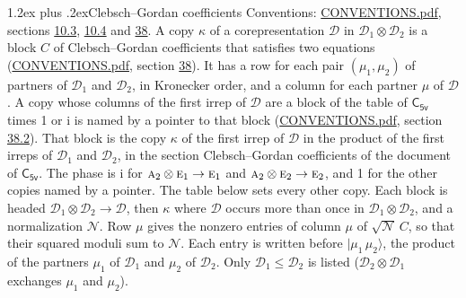 \documentclass[10pt,a4paper]{article}
\makeatletter
\renewcommand\section{\@startsection{section}{1}{\z@}{-3ex plus -1ex minus -.2ex}%
  {1.2ex plus .2ex}{\normalfont\large\sffamily\bfseries\color{parttitle}}}
\numberwithin{equation}{section}
\newcommand{\grp}[1]{\mathsf{#1}}
\newcommand{\irr}[1]{\text{\normalfont\scshape #1}}
\newcommand{\iunit}{\mathrm{i}}
\newcommand{\irrprod}{\otimes}
\newcommand{\mult}{\kappa}
\newcommand{\intx}{\mu}
\newcommand{\cgnorm}{\mathcal{N}}
\newcommand{\prodket}[2]{\lvert {#1}\,{#2}\rangle}
\makeatother
\begin{document}
\section{Clebsch--Gordan coefficients}\label{s:clebsch_gordan}
Conventions: \href{../../CONVENTIONS.pdf}{CONVENTIONS.pdf}, sections \href{../../../rotation/CONVENTIONS.pdf\#conv.10.3}{10.3}, \href{../../../rotation/CONVENTIONS.pdf\#conv.10.4}{10.4} and \href{../../CONVENTIONS.pdf\#conv.38}{38}.
\leavevmode\label{n:index.copy}\label{n:matrix.cg.stored}A copy $\mult$ of a corepresentation $\mathcal{D}$ in $\mathcal{D}_1\irrprod\mathcal{D}_2$ is a block $C$ of Clebsch--Gordan coefficients that satisfies two equations (\href{../../CONVENTIONS.pdf}{CONVENTIONS.pdf}, section \href{../../CONVENTIONS.pdf\#conv.38}{38}). \label{n:index.cg}It has a row for each pair $(\intx_1, \intx_2)$ of partners of $\mathcal{D}_1$ and $\mathcal{D}_2$, in Kronecker order, and a column for each partner $\intx$ of $\mathcal{D}$.
A copy whose columns of the first irrep of $\mathcal{D}$ are a block of the table of $\grp{C_{5v}}$ times 1 or $\iunit$ is named by a pointer to that block (\href{../../CONVENTIONS.pdf}{CONVENTIONS.pdf}, section \href{../../CONVENTIONS.pdf\#conv.38.2}{38.2}). That block is the copy $\mult$ of the first irrep of $\mathcal{D}$ in the product of the first irreps of $\mathcal{D}_1$ and $\mathcal{D}_2$, in the section Clebsch--Gordan coefficients of the document of \href{../../../rotation/data/pdf/C5v.pdf}{$\grp{C_{5v}}$}. The phase is $\iunit$ for $\irr{a}_{2}\irrprod \irr{e}_{1}\to \irr{e}_{1}$ and $\irr{a}_{2}\irrprod \irr{e}_{2}\to \irr{e}_{2}$, and 1 for the other copies named by a pointer. The table below sets every other copy.
Each block is headed $\mathcal{D}_1\irrprod\mathcal{D}_2\to\mathcal{D}$, then $\mult$ where $\mathcal{D}$ occurs more than once in $\mathcal{D}_1\irrprod\mathcal{D}_2$, and a normalization $\cgnorm$. Row $\intx$ gives the nonzero entries of column $\intx$ of $\sqrt{\cgnorm}\,C$, so that their squared moduli sum to $\cgnorm$. \label{n:vector.ket.product}Each entry is written before $\prodket{\intx_1}{\intx_2}$, the product of the partners $\intx_1$ of $\mathcal{D}_1$ and $\intx_2$ of $\mathcal{D}_2$. Only $\mathcal{D}_1 \le \mathcal{D}_2$ is listed ($\mathcal{D}_2\irrprod\mathcal{D}_1$ exchanges $\intx_1$ and $\intx_2$).
\end{document}
